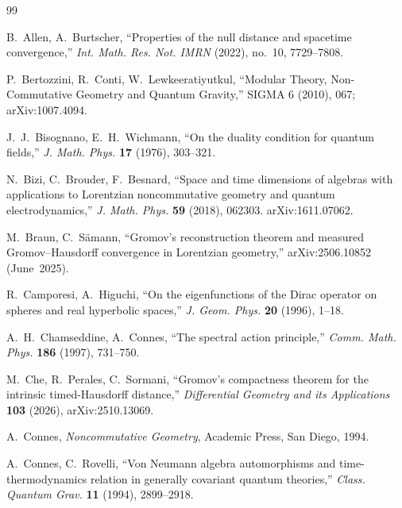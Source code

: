 \documentclass[11pt,a4paper]{article}
\theoremstyle{plain}
\theoremstyle{definition}
\begin{document}
\begin{thebibliography}{99}

B.~Allen, A.~Burtscher, ``Properties of the null distance and
spacetime convergence,'' \emph{Int. Math. Res. Not. IMRN} (2022),
no.~10, 7729--7808.

P.~Bertozzini, R.~Conti, W.~Lewkeeratiyutkul, ``Modular Theory,
Non-Commutative Geometry and Quantum Gravity,''
SIGMA 6 (2010), 067; arXiv:1007.4094.

J.~J.~Bisognano, E.~H.~Wichmann, ``On the duality condition for
quantum fields,'' \emph{J. Math. Phys.} \textbf{17} (1976), 303--321.

N.~Bizi, C.~Brouder, F.~Besnard, ``Space and time dimensions of
algebras with applications to Lorentzian noncommutative geometry and
quantum electrodynamics,'' \emph{J. Math. Phys.} \textbf{59} (2018),
062303. arXiv:1611.07062.

M.~Braun, C.~S\"amann, ``Gromov's reconstruction theorem and measured
Gromov--Hausdorff convergence in Lorentzian geometry,''
arXiv:2506.10852 (June~2025).

R.~Camporesi, A.~Higuchi, ``On the eigenfunctions of the Dirac
operator on spheres and real hyperbolic spaces,''
\emph{J. Geom. Phys.} \textbf{20} (1996), 1--18.

A.~H.~Chamseddine, A.~Connes, ``The spectral action principle,''
\emph{Comm. Math. Phys.} \textbf{186} (1997), 731--750.

M.~Che, R.~Perales, C.~Sormani,
``Gromov's compactness theorem for the intrinsic timed-Hausdorff distance,''
\emph{Differential Geometry and its Applications} \textbf{103} (2026), arXiv:2510.13069.

A.~Connes, \emph{Noncommutative Geometry}, Academic Press, San Diego,
1994.

A.~Connes, C.~Rovelli, ``Von Neumann algebra automorphisms and
time-thermodynamics relation in generally covariant quantum theories,''
\emph{Class. Quantum Grav.} \textbf{11} (1994), 2899--2918.


\end{thebibliography}
\end{document}
